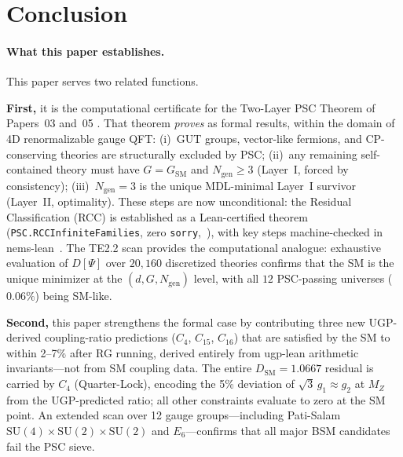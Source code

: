 \documentclass[11pt,twocolumn]{article}
\theoremstyle{remark}
\begin{document}
\section{Conclusion}
\label{sec:conclusion}

\paragraph{What this paper establishes.}
This paper serves two related functions.

\textbf{First,} it is the computational certificate for the
Two-Layer PSC Theorem of Papers~03 and~05
\cite{SpivackNMstar,SpivackPSCOpt}.
That theorem \emph{proves} as formal results, within the domain of 4D
renormalizable gauge QFT: (i)~GUT groups, vector-like fermions, and
CP-conserving theories are structurally excluded by PSC; (ii)~any
remaining self-contained theory must have $G=G_{\mathrm{SM}}$ and
$N_{\mathrm{gen}}\geq 3$ (Layer~I, forced by consistency);
(iii)~$N_{\mathrm{gen}}=3$ is the unique MDL-minimal Layer~I survivor
(Layer~II, optimality).
These steps are now unconditional: the Residual Classification (RCC)
is established as a Lean-certified theorem (\texttt{PSC.RCCInfiniteFamilies},
zero \texttt{sorry},~\cite{ugp-lean}), with key steps machine-checked in
nems-lean~\cite{SpivackGaugeRigidity}.
The TE2.2 scan provides the computational analogue: exhaustive
evaluation of $D[\Psi]$ over $20{,}160$ discretized theories confirms
that the SM is the unique minimizer at the $(d,G,N_{\mathrm{gen}})$
level, with all $12$ PSC-passing universes ($0.06\%$) being SM-like.

\textbf{Second,} this paper strengthens the formal case by contributing
three new UGP-derived coupling-ratio predictions ($C_4$, $C_{15}$,
$C_{16}$) that are satisfied by the SM to within 2--7\% after RG
running, derived entirely from ugp-lean arithmetic invariants---not
from SM coupling data.
The entire $D_{\mathrm{SM}}=1.0667$ residual is carried by $C_4$
(Quarter-Lock), encoding the 5\% deviation of $\sqrt{3}\,g_1\approx
g_2$ at $M_Z$ from the UGP-predicted ratio; all other constraints
evaluate to zero at the SM point.
An extended scan over 12 gauge groups---including Pati-Salam
$\mathrm{SU}(4)\times\mathrm{SU}(2)\times\mathrm{SU}(2)$ and
$E_6$---confirms that all major BSM candidates fail the PSC sieve.
\end{document}
